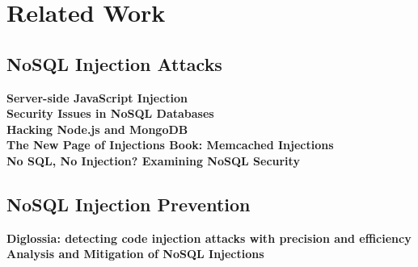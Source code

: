 \chapter{Related Work}

\section{NoSQL Injection Attacks}

\textbf{Server-side JavaScript Injection} \cite{Sullivan:2011} \\

\textbf{Security Issues in NoSQL Databases} \cite{Okman:2011} \\

\textbf{Hacking Node.js and MongoDB} \cite{Petkov:2014a, Petkov:2014b} \\

\textbf{The New Page of Injections Book: Memcached Injections} \cite{Novikov:2014} \\

\textbf{No SQL, No Injection? Examining NoSQL Security} \cite{Ron:2015} \\


\section{NoSQL Injection Prevention}

\textbf{Diglossia: detecting code injection attacks with precision and efficiency} \cite{Son:2013} \\

\textbf{Analysis and Mitigation of NoSQL Injections} \cite{Ron:2016} \\